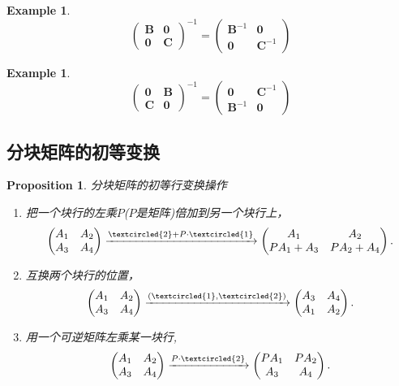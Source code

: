 \documentclass{article}
\newtheorem{proposition}[theorem]{Proposition}
\newtheorem{example}[theorem]{Example}
\newcommand{\mbf}[1]{\bm{#1}}
\begin{document}
\begin{example}
\rm 
$$
\begin{pmatrix}
\mbf{B} & \mbf{0} \\
\mbf{0} & \mbf{C} 
\end{pmatrix}^{-1} = 
\begin{pmatrix}
\mbf{B}^{-1} & \mbf{0} \\
\mbf{0} & \mbf{C}^{-1}
\end{pmatrix}
$$
\end{example}

\begin{example}
\rm
$$
\begin{pmatrix}
\mbf{0} & \mbf{B} \\
\mbf{C} & \mbf{0}
\end{pmatrix}^{-1} = 
\begin{pmatrix}
\mbf{0} & \mbf{C}^{-1} \\
\mbf{B}^{-1} & \mbf{0}
\end{pmatrix}
$$
\end{example}

\newpage
\subsection{分块矩阵的初等变换}

\begin{proposition}
\rm 分块矩阵的初等行变换操作
\begin{enumerate}
	\item 把一个块行的{\color{red}左乘}$P$($P$是矩阵)倍加到另一个块行上，
	$$
	\begin{pmatrix}
	A_1 & A_2 \\
	A_3 & A_4
	\end{pmatrix}\xrightarrow{\tiny\textcircled{2} + P \cdot \tiny\textcircled{1}} 
	\begin{pmatrix}
	A_1 & A_2 \\
	PA_1+A_3 & PA_2 + A_4  
	\end{pmatrix}.
	$$
	\item 互换两个块行的位置，
	$$
	\begin{pmatrix}
	A_1 & A_2 \\
	A_3 & A_4
	\end{pmatrix}\xrightarrow{(\tiny\textcircled{1} ,  \tiny\textcircled{2})} 
	\begin{pmatrix}
	A_3 & A_4 \\
	A_1 & A_2   
	\end{pmatrix}.
	$$
	\item 用一个可逆矩阵{\color{red}左乘}某一块行,
	$$
	\begin{pmatrix}
	A_1 & A_2 \\
	A_3 & A_4
	\end{pmatrix}\xrightarrow{P\cdot \tiny\textcircled{2}} 
	\begin{pmatrix}
	PA_1 & PA_2 \\
	A_3 & A_4   
	\end{pmatrix}.
	$$
\end{enumerate}
\end{proposition}
\end{document}
